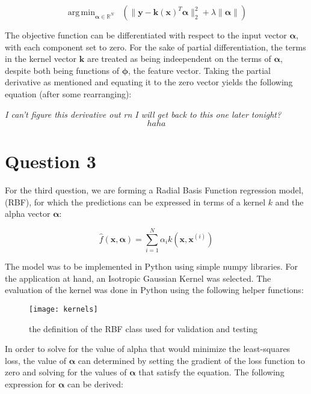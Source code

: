 \documentclass{article}
\DeclareMathOperator*{\argmin}{arg\,min}
\begin{document}
\begin{equation}
\argmin_{\boldsymbol\alpha \in \mathbb{R}^N} \;\; (\| \mathbf{y} - \mathbf{k(x)}^T\boldsymbol\alpha \|_{2}^2 + \lambda \|\boldsymbol\alpha \|)
\end{equation}

The objective function can be differentiated with respect to the input vector $\boldsymbol\alpha$, with each component set to zero. For the sake of partial differentiation, the terms in the kernel vector $\mathbf{k}$ are treated as being indeependent on the terms of $\boldsymbol\alpha$, despite both being functions of $\boldsymbol\phi$, the feature vector. Taking the partial derivative as mentioned and equating it to the zero vector yields the following equation (after some rearranging):

\textit{I can't figure this derivative out rn I will get back to this one later tonight?}
\begin{equation}
haha
\end{equation}

\section*{Question 3}
For the third question, we are forming a Radial Basis Function regression model, (RBF), for which the predictions can be expressed in terms of a kernel $k$ and the alpha vector $\boldsymbol\alpha$:

\begin{equation}
\hat{f}(\mathbf{x}, \boldsymbol\alpha) = \sum_{i=1}^{N} \alpha_i k(\mathbf{x}, \mathbf{x}^{(i)})
\end{equation}

The model was to be implemented in Python using simple numpy libraries. For the application at hand, an Isotropic Gaussian Kernel was selected. The evaluation of the kernel was done in Python using the following helper functions:


\begin{figure}[H]
\centering
\texttt{[image: kernels]}
\caption{the definition of the RBF class used for validation and testing}
\end{figure}

 In order to solve for the value of alpha that would minimize the least-squares loss, the value of $\boldsymbol\alpha$ can determined by setting the gradient of the loss function to zero and solving for the values of $\boldsymbol\alpha$ that satisfy the equation. The following expression for $\boldsymbol\alpha$ can be derived:
\end{document}
